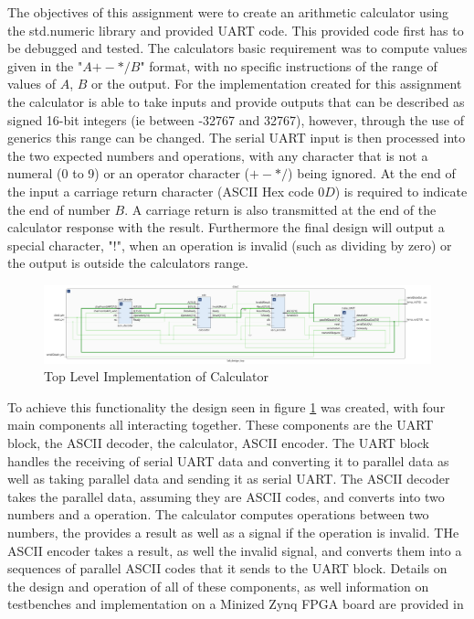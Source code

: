 \documentclass[11pt]{article}
\begin{document}
The objectives of this assignment were to create an arithmetic calculator using the std.numeric library and provided UART code.
This provided code first has to be debugged and tested.
The calculators basic requirement was to compute values given in the "$A {+-*/} B$" format, with no specific instructions of the range of values of $A$, $B$ or the output.
For the implementation created for this assignment the calculator is able to take inputs and provide outputs that can be described as signed 16-bit integers (ie between -32767 and 32767),
however, through the use of generics this range can be changed.
The serial UART input is then processed into the two expected numbers and operations, with any character that is not a numeral (0 to 9) or an operator character ($+-*/$) being ignored.
At the end of the input a carriage return character (ASCII Hex code $0D$) is required to indicate the end of number $B$.
A carriage return is also transmitted at the end of the calculator response with the result.
Furthermore the final design will output a special character, "!", when an operation is invalid (such as dividing by zero) or the output is outside the calculators range.

\begin{figure}[H]        
    \centering
    \includegraphics[width=\textwidth]{TopLevelImp.png}
    \caption{Top Level Implementation of Calculator}
    \label{fig:toplevel}
\end{figure} 

To achieve this functionality the design seen in figure \ref{fig:toplevel} was created, with four main components all interacting together.
These components are the UART block, the ASCII decoder, the calculator, ASCII encoder.
The UART block handles the receiving of serial UART data and converting it to parallel data as well as taking parallel data and sending it as serial UART.
The ASCII decoder takes the parallel data, assuming they are ASCII codes, and converts into two numbers and a operation.
The calculator computes operations between two numbers, the provides a result as well as a signal if the operation is invalid.
THe ASCII encoder takes a result, as well the invalid signal, and converts them into a sequences of parallel ASCII codes that it sends to the UART block.
Details on the design and operation of all of these components, as well information on testbenches and implementation on a Minized Zynq FPGA board are provided in
\end{document}

